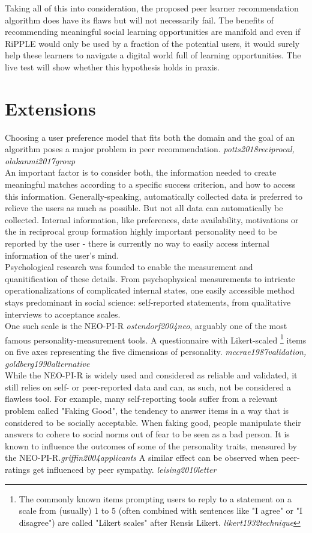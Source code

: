 \documentclass[nochapterpage,bigchapter,linedtoc,longdoc,colorback,accentcolor=tud3b,oneside]{tudreport}
\begin{document}
Taking all of this into consideration, the proposed peer learner recommendation algorithm does have its flaws but will not necessarily fail. The benefits of recommending meaningful social learning opportunities are manifold and even if RiPPLE would only be used by a fraction of the potential users, it would surely help these learners to navigate a digital world full of learning opportunities. The live test will show whether this hypothesis holds in praxis.\\


\chapter{Extensions} \label{extensions}
Choosing a user preference model that fits both the domain and the goal of an algorithm poses a major problem in peer recommendation. \textit{potts2018reciprocal, olakanmi2017group}\\
An important factor is to consider both, the information needed to create meaningful matches according to a specific success criterion, and how to access this information. Generally-speaking, automatically collected data is preferred to relieve the users as much as possible. But not all data can automatically be collected. Internal information, like preferences, date availability, motivations or the in reciprocal group formation highly important personality need to be reported by the user - there is currently no way to easily access internal information of the user's mind.\\
Psychological research was founded to enable the measurement and quanitification of these details. From psychophysical measurements to intricate operationalizations of complicated internal states, one easily accessible method stays predominant in social science: self-reported statements, from qualitative interviews to acceptance scales.\\
One such scale is the NEO-PI-R \textit{ostendorf2004neo}, arguably one of the most famous personality-measurement tools. A questionnaire with Likert-scaled \footnote{The commonly known items prompting users to reply to a statement on a scale from (usually) 1 to 5 (often combined with sentences like "I agree" or "I disagree") are called "Likert scales" after Rensis Likert. \textit{likert1932technique}} items on five axes representing the five dimensions of personality. \textit{mccrae1987validation, goldberg1990alternative}\\
While the NEO-PI-R is widely used and considered as reliable and validated, it still relies on self- or peer-reported data and can, as such, not be considered a flawless tool. For example, many self-reporting tools suffer from a relevant problem called "Faking Good", the tendency to answer items in a way that is considered to be socially acceptable. When faking good, people manipulate their answers to cohere to social norms out of fear to be seen as a bad person. It is known to influence the outcomes of some of the personality traits, measured by the NEO-PI-R.\textit{griffin2004applicants} A similar effect can be observed when peer-ratings get influenced by peer sympathy. \textit{leising2010letter}\\
\end{document}
